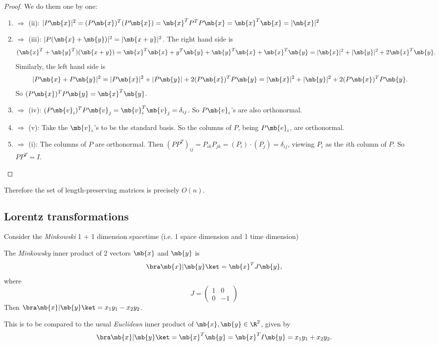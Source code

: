 \documentclass[a4paper]{article}
\begin{document}
\begin{proof}
  We do them one by one:
  \begin{enumerate}
  \item $\Rightarrow$ (ii): $|P\mb{x}|^2 = (P\mb{x})^T(P\mb{x}) = \mb{x}^TP^TP\mb{x} = \mb{x}^T\mb{x} = |\mb{x}|^2$
  \item $\Rightarrow$ (iii): $|P(\mb{x} + \mb{y})|^2 = |\mb{x + y}|^2$. The right hand side is
    \[
    (\mb{x}^T + \mb{y}^T)(\mb{x + y}) = \mb{x}^T\mb{x} + y^T\mb{y} + \mb{y}^T\mb{x} + \mb{x}^T\mb{y} = |\mb{x}|^2 + |\mb{y}|^2  + 2\mb{x}^T\mb{y}.
    \]
    Similarly, the left hand side is
    \[
    |P\mb{x} + P\mb{y}|^2 = |P\mb{x}|^2 + |P\mb{y}| + 2(P\mb{x})^TP\mb{y} = |\mb{x}|^2 + |\mb{y}|^2 + 2(P\mb{x})^TP\mb{y}.
    \]
    So $(P\mb{x})^TP\mb{y} = \mb{x}^T\mb{y}$.
  \item $\Rightarrow$ (iv): $(P\mb{v}_i)^TP\mb{v}_j = \mb{v}_i^T\mb{v}_j = \delta_{ij}$. So $P\mb{v}_i$'s are also orthonormal.
  \item $\Rightarrow$ (v): Take the $\mb{v}_i$'s to be the standard basis. So the columns of $P$, being $P\mb{e}_i$, are orthonormal.
  \item $\Rightarrow$ (i): The columns of $P$ are orthonormal. Then $(PP^T)_{ij} = P_{ik}P_{jk} = (P_i)\cdot (P_j) = \delta_{ij}$, viewing $P_i$ as the $i$th column of $P$. So $PP^T = I$.
  \end{enumerate}
\end{proof}

Therefore the set of length-preserving matrices is precisely $O(n)$.

\subsection{Lorentz transformations}
Consider the \emph{Minkowski} 1 + 1 dimension spacetime (i.e. 1 space dimension and 1 time dimension)

\begin{defi}
  The \emph{Minkowsky} inner product of 2 vectors $\mb{x}$ and $\mb{y}$ is
  \[
  \bra \mb{x}|\mb{y}\ket = \mb{x}^TJ\mb{y},
  \]
  where
  \[
  J = 
  \begin{pmatrix}
    1 & 0\\
    0 & -1
  \end{pmatrix}
  \]
  Then $\bra \mb{x}|\mb{y}\ket = x_1y_1 - x_2y_2$.
\end{defi}
This is to be compared to the usual \emph{Euclidean} inner product of $\mb{x}, \mb{y}\in \R^2$, given by
\[
\bra \mb{x}|\mb{y}\ket = \mb{x}^T\mb{y} = \mb{x}^TI\mb{y} = x_1y_1 + x_2y_2.
\]
\end{document}
